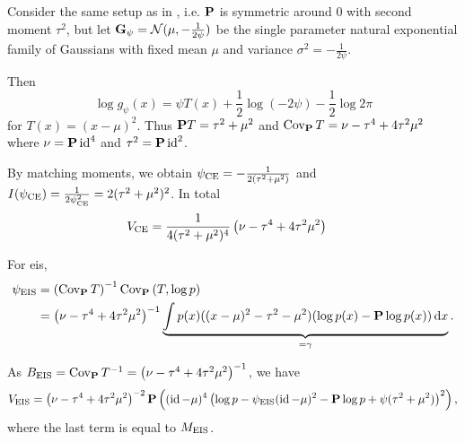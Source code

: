 \begin{example}
    \label{ex:univ-gaussian-mu-fixed}
    Consider the same setup as in , i.e. $\P$ is symmetric around $0$ with second moment $\tau^{2}$, but let $\G_{\psi} = \mathcal N(\mu, -\frac{1}{2\psi})$ be the single parameter natural exponential family of Gaussians with fixed mean $\mu$ and variance $\sigma^{2} = -\frac{1}{2 \psi}$. 
    
    Then
    $$
    \log g_{\psi}(x) = \psi T(x) + \frac{1}{2}\log \left( - 2 \psi \right) - \frac{1}{2} \log 2\pi
    $$
    for $T(x) = (x - \mu)^{2}$. Thus $\P T = \tau^{2} + \mu^{2}$ and $\cov_{\P} T = \nu - \tau^{4} + 4\tau^{2}\mu^{2}$ where $\nu = \P \operatorname{id}^{4}$ and $\tau^{2} = \P \id^{2}$. 

    By matching moments, we obtain $\pce = -\frac{1}{2(\tau^{2} + \mu^{2})}$ and $I(\pce) = \frac{1}{2\psi^{2}_\ce} = 2(\tau^{2} + \mu^{2})^{2}$. In total 
    \begin{align}
        V_{\ce} &= \frac{1}{4 (\tau^{2} + \mu^{2})^{4}} \left( \nu - \tau^{4} + 4\tau^{2}\mu^{2} \right)
    \end{align}

    For \gls{eis},
    \begin{align*}
    \peis &= \left( \cov_{\P} T \right)^{-1} \cov_{\P} \left( T, \log p \right) \\
        &= \left( \nu - \tau^{4} + 4\tau^{2}\mu^{2} \right)^{-1} \underbrace{\int p(x)((x-\mu)^{2}-\tau^{2} - \mu^{2})(\log p(x) - \P\log p(x)) \d x}_{=\gamma}.
    \end{align*}
    
    As $B_{\eis} = \cov_{\P} T ^{-1} = \left( \nu - \tau^{4} + 4 \tau^{2}\mu^{2} \right)^{-1}$, we have
    \begin{align*}
        V_{\eis} = \left( \nu - \tau^{4} + 4 \tau^{2}\mu^{2}\right)^{-2} \P \left( (\id - \mu)^{4} \left( \log p - \peis (\id - \mu)^{2} - \P \log p + \psi (\tau^{2} + \mu^{2}) \right)^{2} \right),
    \end{align*}
    where the last term is equal to $M_{\eis}$. 


\end{example}
